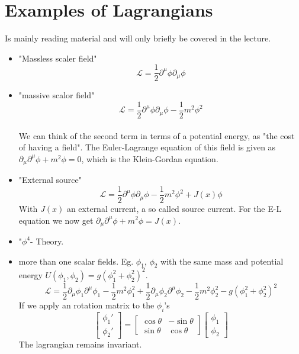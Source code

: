 \documentclass{report}
\begin{document}
\chapter{Examples of Lagrangians}
Is mainly reading material and will only briefly be covered in the lecture.\\
\begin{itemize}
	\item "Massless scaler field" \[
			\mathcal{L} = \frac{1}{2} \partial^\mu \phi \partial_\mu \phi  
	\]  
	\item "massive scalor field" \[
		\mathcal{L} = \frac{1}{2} \partial^\mu \phi \partial_\mu \phi - \frac{1}{2} m^2 \phi^2  
\] \\
We can think of the second term in terms of a potential energy, as "the cost of having a field". The Euler-Lagrange equation of this field is given as $\partial_\mu \partial^\mu \phi + m^2 \phi =0  $, which is the Klein-Gordan equation.\\
       \item "External source" \[
		       \mathcal{L} = \frac{1}{2} \partial^\mu \phi \partial_\mu \phi - \frac{1}{2} m^2 \phi^2 + J(x) \phi 
	       \] With $J(x)$ an external current, a so called source current. For the E-L equation we now get $\partial_\mu \partial^\mu \phi + m^2 \phi = J(x)$.\\
       \item "$\phi^4$- Theory.\\
       \item more than one scalar fields. Eg. $\phi_1$, $\phi_2$ with the same mass and potential energy $U\left( \phi_1, \phi_2 \right) = g\left( \phi_1^2 + \phi_2^2 \right)^2$. \[
		       \mathcal{L} = \frac{1}{2} \partial_\mu \phi_1 \partial^\mu \phi_1 - \frac{1}{2}m^2 \phi_1^2 + \frac{1}{2} \partial_\mu \phi_2 \partial^\mu \phi_2 - \frac{1}{2} m^2 \phi_2^2 - g \left( \phi_1^2 + \phi_2^2 \right)^2 
       \] 
       If we apply an rotation matrix to the $\phi_i$'s \[
	       \begin{bmatrix} \phi_1' \\ \phi_2' \end{bmatrix} = \begin{bmatrix} \cos \theta & -\sin \theta \\ \sin \theta & \cos \theta \end{bmatrix} \begin{bmatrix} \phi_1 \\ \phi_2 \end{bmatrix} 
       \] The lagrangian remains invariant. \[
\]
\end{itemize}
\end{document}
